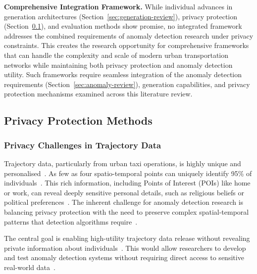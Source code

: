 \documentclass[runningheads]{llncs}
\begin{document}
\textbf{Comprehensive Integration Framework.} While individual advances in generation architectures (Section~\ref{sec:generation-review}), privacy protection (Section~\ref{sec:privacy-review}), and evaluation methods show promise, no integrated framework addresses the combined requirements of anomaly detection research under privacy constraints. This creates the research opportunity for comprehensive frameworks that can handle the complexity and scale of modern urban transportation networks while maintaining both privacy protection and anomaly detection utility. Such frameworks require seamless integration of the anomaly detection requirements (Section~\ref{sec:anomaly-review}), generation capabilities, and privacy protection mechanisms examined across this literature review.

\subsection{Privacy Protection Methods}
\label{sec:privacy-review}

\subsubsection{Privacy Challenges in Trajectory Data}

Trajectory data, particularly from urban taxi operations, is highly unique and personalised~\cite{Primault2019LongRoad,Buchholz2022RAoPT,Ma2021TrajectoryPrivacy}. As few as four spatio-temporal points can uniquely identify 95\% of individuals~\cite{Primault2019LongRoad,Buchholz2022RAoPT,Ma2021TrajectoryPrivacy}. This rich information, including Points of Interest (POIs) like home or work, can reveal deeply sensitive personal details, such as religious beliefs or political preferences~\cite{Primault2019LongRoad,Buchholz2022RAoPT}. The inherent challenge for anomaly detection research is balancing privacy protection with the need to preserve complex spatial-temporal patterns that detection algorithms require~\cite{Buchholz2024SoK,Buchholz2022RAoPT,Primault2019LongRoad,Naghizade2020PrivacyContextAware}.

The central goal is enabling high-utility trajectory data release without revealing private information about individuals~\cite{Buchholz2024SoK,Rao2021LSTMTrajGAN,Liu2018TrajGANs,Jin2023SurveyExpStudy,Ma2021TrajectoryPrivacy,Naghizade2020PrivacyContextAware}. This would allow researchers to develop and test anomaly detection systems without requiring direct access to sensitive real-world data~\cite{Buchholz2024SoK,Rao2021LSTMTrajGAN,Liu2018TrajGANs}.
\end{document}
